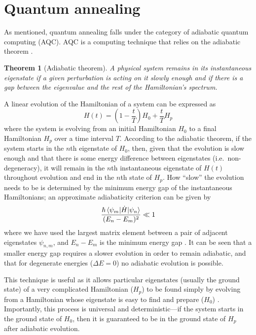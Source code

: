\documentclass[12pt]{article}
\newtheorem*{theorem}{Theorem}
\theoremstyle{definition}
\begin{document}
\section{Quantum annealing}

As mentioned, quantum annealing falls under the category of adiabatic quantum computing (AQC). AQC is a computing technique that relies on the adiabatic theorem \cite{born_beweis_1928}.

\begin{theorem}[Adiabatic theorem]
    A physical system remains in its instantaneous eigenstate if a given perturbation is acting on it slowly enough and if there is a gap between the eigenvalue and the rest of the Hamiltonian's spectrum.
    \label{thm:adiabatic}
\end{theorem}

A linear evolution of the Hamiltonian of a system can be expressed as
\begin{equation}
    H(t)=\left(1- \frac{t}{T}\right)H_0 + \frac{t}{T}H_p
    \label{eq:time-evolution}
\end{equation}
where the system is evolving from an initial Hamiltonian $H_0$ to a final Hamiltonian $H_p$ over a time interval $T$. According to the adiabatic theorem, if the system starts in the $n$th eigenstate of $H_0$, then, given that the evolution is slow enough and that there is some energy difference between eigenstates (i.e.\ non-degeneracy), it will remain in the $n$th instantaneous eigenstate of $H(t)$ throughout evolution and end in the $n$th state of $H_p$. How ``slow'' the evolution needs to be is determined by the minimum energy gap of the instantaneous Hamiltonians; an approximate adiabaticity criterion can be given by
\begin{equation}
    \frac{\hbar\braket{\psi_m|\dot{H}|\psi_n}}{(E_n-E_m)^2} \ll 1
    \label{eq:energy-gap}
\end{equation}
where we have used the largest matrix element between a pair of adjacent eigenstates $\psi_{n,m}$, and ${E_n-E_m}$ is the minimum energy gap \cite{sakurai_quantum_2020}. It can be seen that a smaller energy gap requires a slower evolution in order to remain adiabatic, and that for degenerate energies ($\Delta E=0$) no adiabatic evolution is possible.

This technique is useful as it allows particular eigenstates (usually the ground state) of a very complicated Hamiltonian ($H_p$) to be found simply by evolving from a Hamiltonian whose eigenstate is easy to find and prepare ($H_0$) \cite{farhi_quantum_2001}. Importantly, this process is universal and deterministic---if the system starts in the ground state of $H_0$, then it is guaranteed to be in the ground state of $H_p$ after adiabatic evolution.
\end{document}
